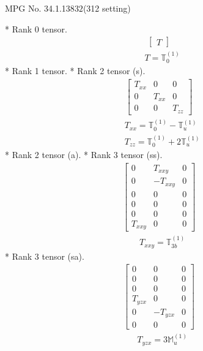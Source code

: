 \documentclass[fleqn,8pt,landscape]{jsarticle}
\begin{document}
\setcounter{MaxMatrixCols}{32}

\renewcommand{\tablename}{Table~}
\renewcommand{\figurename}{Figure~}
\begin{center}
\LARGE
MPG No. 34.1.138\quad$32$\quad(312 setting)
\end{center}
* Rank 0 tensor.
\begin{align*}
\begin{bmatrix} T \end{bmatrix}
\end{align*}
\begin{align*}
& T = \mathbb{T}_{0}^{(1)}
\end{align*}
* Rank 1 tensor.
* Rank 2 tensor (s).
\begin{align*}
\begin{bmatrix} T_{xx} & 0 & 0 \\ 0 & T_{xx} & 0 \\ 0 & 0 & T_{zz} \end{bmatrix}
\end{align*}
\begin{align*}
& T_{xx} = \mathbb{T}_{0}^{(1)} - \mathbb{T}_{u}^{(1)} \\
& T_{zz} = \mathbb{T}_{0}^{(1)} + 2 \mathbb{T}_{u}^{(1)}
\end{align*}
* Rank 2 tensor (a).
* Rank 3 tensor (ss).
\begin{align*}
\begin{bmatrix} 0 & T_{xxy} & 0 \\ 0 & - T_{xxy} & 0 \\ 0 & 0 & 0 \\ 0 & 0 & 0 \\ 0 & 0 & 0 \\ T_{xxy} & 0 & 0 \end{bmatrix}
\end{align*}
\begin{align*}
& T_{xxy} = \mathbb{T}_{3b}^{(1)}
\end{align*}
* Rank 3 tensor (sa).
\begin{align*}
\begin{bmatrix} 0 & 0 & 0 \\ 0 & 0 & 0 \\ 0 & 0 & 0 \\ T_{yzx} & 0 & 0 \\ 0 & - T_{yzx} & 0 \\ 0 & 0 & 0 \end{bmatrix}
\end{align*}
\begin{align*}
& T_{yzx} = 3 \mathbb{M}_{u}^{(1)}
\end{align*}
\end{document}
